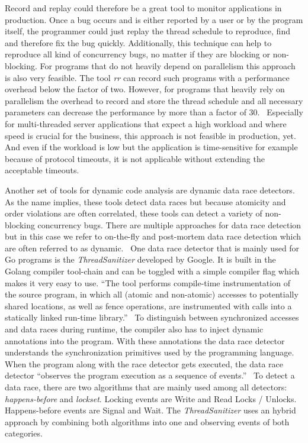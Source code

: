 \documentclass[conference]{IEEEtran}
\begin{document}
Record and replay could therefore be a great tool to monitor applications in production.
Once a bug occurs and is either reported by a user or by the program itself, the programmer could just replay the thread schedule to reproduce, find and therefore fix the bug quickly.
Additionally, this technique can help to reproduce all kind of concurrency bugs, no matter if they are blocking or non-blocking.
For programs that do not heavily depend on parallelism this approach is also very feasible.
The tool \emph{rr} can record such programs with a performance overhead below the factor of two.
However, for programs that heavily rely on parallelism the overhead to record and store the thread schedule and all necessary parameters can decrease the performance by more than a factor of 30.~\cite{o2017engineering}
Especially for multi-threaded server applications that expect a high workload and where speed is crucial for the business, this approach is not feasible in production, yet.
And even if the workload is low but the application is time-sensitive for example because of protocol timeouts, it is not applicable without extending the acceptable timeouts.

Another set of tools for dynamic code analysis are dynamic data race detectors.
As the name implies, these tools detect data races but because atomicity and order violations are often correlated, these tools can detect a variety of non-blocking concurrency bugs.
There are multiple approaches for data race detection but in this case we refer to on-the-fly and post-mortem data race detection which are often referred to as dynamic.~\cite{serebry2009threadsanitizer}
One data race detector that is mainly used for Go programs is the \emph{ThreadSanitizer} developed by Google.
It is built in the Golang compiler tool-chain and can be toggled with a simple compiler flag which makes it very easy to use.
``The tool performs compile-time instrumentation of the source program, in which all (atomic and non-atomic) accesses to potentially shared locations, as well as fence operations, are instrumented with calls into a statically linked run-time library.''~\cite{lidbury2019sparse}
To distinguish between synchronized accesses and data races during runtime, the compiler also has to inject dynamic annotations into the program.
With these annotations the data race detector understands the synchronization primitives used by the programming language.
When the program along with the race detector gets executed, the data race detector ``observes the program execution as a sequence of events.''~\cite{serebry2009threadsanitizer}
To detect a data race, there are two algorithms that are mainly used among all detectors: \emph{happens-before} and \emph{lockset}.
Locking events are Write and Read Locks / Unlocks.
Happens-before events are Signal and Wait.
The \emph{ThreadSanitizer} uses an hybrid approach by combining both algorithms into one and observing events of both categories.
\end{document}
